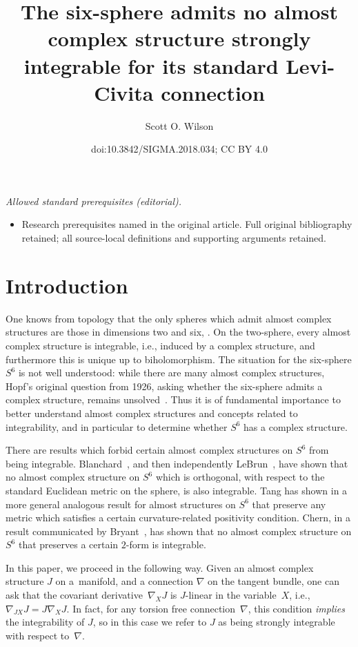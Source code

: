 \documentclass[10pt,a4paper]{amsart}
\title{The six-sphere admits no almost complex structure strongly integrable for its standard Levi-Civita connection}
\author{Scott O. Wilson}
\date{doi:10.3842/SIGMA.2018.034; CC BY 4.0}
\numberwithin{equation}{section}
\begin{document}
\maketitle
\noindent\textit{Allowed standard prerequisites (editorial).}\begin{itemize}
\item Research prerequisites named in the original article. Full original bibliography retained; all source-local definitions and supporting arguments retained.
\end{itemize}\medskip
\section{Introduction}

One knows from topology that the only spheres which admit almost complex structures are those in dimensions two and six, \cite{BS}. On the two-sphere, every almost complex structure is integrable, i.e., induced by a complex structure, and furthermore this is unique up to biholomorphism. The situation for the six-sphere $S^6$ is not well understood: while there are many almost complex structures, Hopf's original question from 1926, asking whether the six-sphere admits a complex structure, remains unsolved~\cite{H}. Thus it is of fundamental importance to better understand almost complex structures and concepts related to integrability, and in particular to determine whether $S^6$ has a complex structure.

There are results which forbid certain almost complex structures on $S^6$ from being integrable. Blanchard~\cite{Bl}, and then independently LeBrun~\cite{L}, have shown that no almost complex structure on $S^6$ which is orthogonal, with respect to the standard Euclidean metric on the sphere, is also integrable. Tang has shown in \cite{T} a more general analogous result for almost structures on $S^6$ that preserve any metric which satisfies a certain curvature-related positivity condition. Chern, in a result communicated by Bryant~\cite{Br}, has shown that no almost complex structure on $S^6$ that preserves a certain $2$-form is integrable.

In this paper, we proceed in the following way. Given an almost complex structure $J$ on a~manifold, and a connection $\nabla$ on the tangent bundle, one can ask that the covariant derivative~$\nabla_X J$ is $J$-linear in the variable~$X$, i.e., $\nabla_{J X } J = J \nabla_X J$. In fact, for any torsion free connection~$\nabla$, this condition \emph{implies} the integrability of $J$, so in this case we refer to $J$ as being strongly integrable with respect to~$\nabla$.
\end{document}
